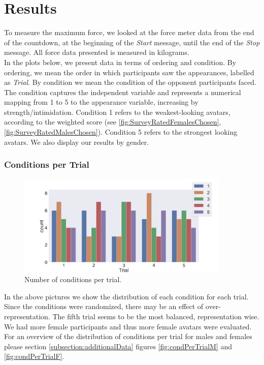 \section{Results}
To measure the maximum force, we looked at the force meter data from the end of the countdown, at the beginning of the \textit{Start} message, until the end of the \textit{Stop} message. All force data presented is measured in kilograms. 
\\
In the plots below, we present data in terms of ordering and condition. By ordering, we mean the order in which participants saw the appearances, labelled as \textit{Trial}. By condition we mean the condition of the opponent participants faced. The condition captures the independent variable and represents a numerical mapping from 1 to 5 to the appearance variable, increasing by strength/intimidation. Condition 1 refers to the weakest-looking avatars, according to the weighted score (see \ref{fig:SurveyRatedFemalesChosen},\ref{fig:SurveyRatedMalesChosen}). Condition 5 refers to the strongest looking avatars. We also display our results by gender. \\

\subsubsection{Conditions per Trial}
\begin{figure}[H]
\vspace*{-3mm}
 \centering
 \captionsetup{justification=centering,margin=0.1cm}
\includegraphics[width=0.9\textwidth]{Files/Plots/condition_by_trial.png}
 \caption{Number of conditions per trial.}
 \label{fig:condPerTrial}
  \end{figure}

In the above pictures we show the distribution of each condition for each trial. Since the conditions were randomized, there may be an effect of over-representation. The fifth trial seems to be the most balanced, representation wise.
We had more female participants and thus more female avatars were evaluated. For an overview of the distribution of conditions per trial for males and females please section \ref{subsection:additionalData} figures \ref{fig:condPerTrialM} and \ref{fig:condPerTrialF}.

